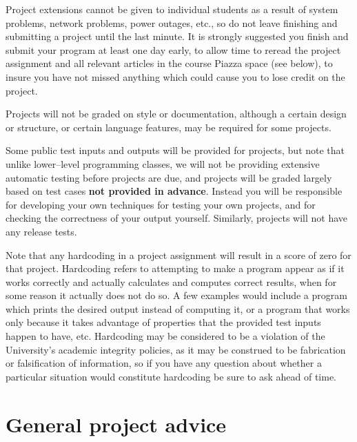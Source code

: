 \documentclass[10pt]{article}
\begin{document}
    Project extensions cannot be given to individual students as a result of
  system problems, network problems, power outages, etc., so do not leave
  finishing and submitting a project until the last minute.  It is strongly
  suggested you finish and submit your program at least one day early, to
  allow time to reread the project assignment and all relevant articles in
  the course Piazza space (see below), to insure you have not missed
  anything which could cause you to lose credit on the project.

    Projects will not be graded on style or documentation, although a
  certain design or structure, or certain language features, may be
  required for some projects.  

    Some public test inputs and outputs will be provided for projects, but
  note that unlike lower--level programming classes, we will not be
  providing extensive automatic testing before projects are due, and
  projects will be graded largely based on test cases \textbf{not provided
  in advance}.  Instead you will be responsible for developing your own
  techniques for testing your own projects, and for checking the correctness of
  your output yourself.  Similarly, projects will not have any release tests.

    Note that any hardcoding in a project assignment will result in a score of
  zero for that project.  Hardcoding refers to attempting to make a program
  appear as if it works correctly and actually calculates and computes
  correct results, when for some reason it actually does not do so.  A few
  examples would include a program which prints the desired output instead
  of computing it, or a program that works only because it takes advantage
  of properties that the provided test inputs happen to have, etc.
  Hardcoding may be considered to be a violation of the University's
  academic integrity policies, as it may be construed to be fabrication or
  falsification of information, so if you have any question about whether a
  particular situation would constitute hardcoding be sure to ask ahead of
  time.

  \section{General project advice}

    \vspace{-.5mm}
\end{document}
